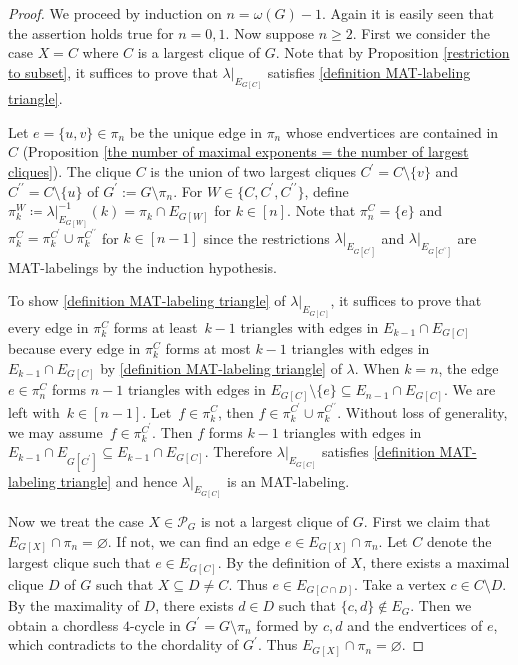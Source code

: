 \documentclass[ALCO, Unicode,published]{cedram}
\begin{document}
\begin{proof}
We proceed by induction on $ n = \omega(G)-1 $. 
Again it is easily seen that the assertion holds true for  $ n = 0,1 $.
Now suppose $ n \geq 2 $. 
First we consider the case $X=C$ where $C$ is a largest clique of $ G $. 
Note that by Proposition \ref{restriction to subset}, it suffices to prove that $ \lambda|_{E_{G[C]}} $ satisfies \ref{definition MAT-labeling triangle}. 

Let $e=\{u,v\} \in\pi_n$ be the unique edge in $\pi_n$ whose endvertices are contained in~$C$ (Proposition \ref{the number of maximal exponents = the number of largest cliques}).
The clique $ C $ is the union of two largest cliques $ C^{\prime} = C \setminus  \{v\}$ and $ C^{\prime\prime} = C \setminus  \{u\} $ of $ G^{\prime} := G\setminus\pi_{n} $. 
For $ W \in \{C,C^{\prime}, C^{\prime\prime}\} $, define $ \pi_{k}^{W} \coloneqq \lambda|_{E_{G[W]}}^{-1}(k) = \pi_{k} \cap E_{G[W]} $ for $ k \in [n]$. 
Note that $ \pi_{n}^{C} = \{e\} $ and $ \pi_{k}^{C} = \pi_{k}^{C^{\prime}} \cup \pi_{k}^{C^{\prime\prime}} $ for $ k \in [n-1] $ since the restrictions $ \lambda|_{E_{G[C^{\prime}]}} $ and $ \lambda|_{E_{G[C^{\prime\prime}]}} $ are MAT-labelings by the induction hypothesis. 

To show \ref{definition MAT-labeling triangle} of $ \lambda|_{E_{G[C]}} $, it suffices to prove that every edge in $ \pi_{k}^{C} $ forms at least~$ k-1 $ triangles with edges in $ E_{k-1} \cap E_{G[C]} $ because every edge in $ \pi_{k}^{C} $ forms at most $ k-1 $ triangles with edges in $ E_{k-1} \cap E_{G[C]} $ by \ref{definition MAT-labeling triangle} of $ \lambda $. 
When $ k = n $, the edge~$ e \in \pi_{n}^{C} $ forms $ n-1 $ triangles with edges in $E_{G[C]}\setminus\{e\} \subseteq E_{n-1} \cap E_{G[C]} $. 
We are left with~$ k \in [n-1] $. 
Let~$ f \in \pi_{k}^{C} $, then $ f \in \pi_{k}^{C^{\prime}} \cup \pi_{k}^{C^{\prime\prime}} $. 
Without loss of generality, we may assume~$ f \in \pi_{k}^{C^{\prime}} $. 
Then $f$ forms $ k-1 $ triangles with edges in~$ E_{k-1} \cap E_{G[C^{\prime}]} \subseteq E_{k-1} \cap E_{G[C]} $. 
Therefore $ \lambda|_{E_{G[C]}} $ satisfies \ref{definition MAT-labeling triangle} and hence $ \lambda|_{E_{G[C]}} $ is an MAT-labeling. 

Now we treat the case $ X \in \mathcal{P}_{G} $ is not a largest clique of $ G $. 
First we claim that~$ E_{G[X]} \cap \pi_{n} = \varnothing $. 
If not, we can find an edge $ e \in E_{G[X]} \cap \pi_{n} $. 
Let $ C $ denote the largest clique such that $ e \in E_{G[C]} $. 
By the definition of $X$, there exists a maximal clique $ D $ of $G$ such that $X\subseteq  D \neq C$. 
Thus $ e \in E_{G[C\cap D]} $. 
Take a vertex $ c \in C\setminus D $. 
By the maximality of $ D $, there exists $ d \in D $ such that $\{c,d\} \notin E_G$. 
Then we obtain a chordless $4$-cycle  in $ G^{\prime} = G\setminus \pi_{n} $ formed by $ c,d $ and the endvertices of $ e $, which contradicts to the chordality of $ G^{\prime} $. 
Thus $ E_{G[X]} \cap \pi_{n} = \varnothing $. 


\end{proof}
\end{document}
